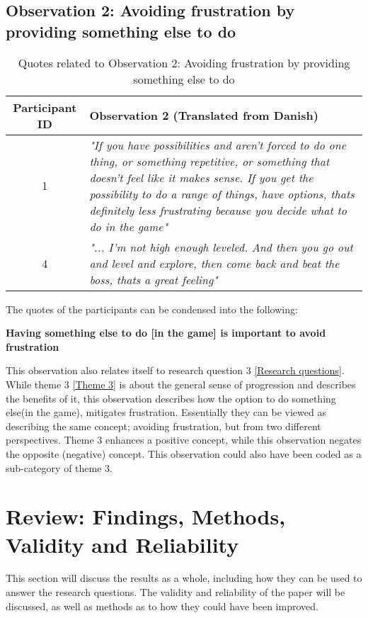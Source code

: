\subsection{Observation 2: Avoiding frustration by providing something else to do}\label{Observation 2}
\begin{table}[H]

\centering
\begin{tabular}{@{}c p{11cm}@{}}
\toprule
\textbf{Participant ID} & \textbf{Observation 2} (Translated from Danish)\\
\midrule

1 & \textit{"If you have possibilities and aren't forced to do one thing, or something repetitive, or something that doesn't feel like it makes sense. If you get the possibility to do a range of things, have options, thats definitely less frustrating because you decide what to do in the game"}\\

\midrule

4& \textit{"... I'm not high enough leveled. And then you go out and level and explore, then come back and beat the boss, thats a great feeling"}\\
\bottomrule
\end{tabular}

\caption{Quotes related to Observation 2: Avoiding frustration by providing something else to do}
\label{tab:obs2-quotes}
\end{table}

The quotes of the participants can be condensed into the following:
\begin{center}
    \textbf{Having something else to do [in the game] is important to avoid frustration}
\end{center}

This observation also relates itself to research question 3 \ref{Research questions}. While theme 3 \ref{Theme 3} is about the general sense of progression and describes the benefits of it, this observation describes how the option to do something else(in the game), mitigates frustration. Essentially they can be viewed as describing the same concept; avoiding frustration, but from two different perspectives. Theme 3 enhances a positive concept, while this observation negates the opposite (negative) concept. This observation could also have been coded as a sub-category of theme 3. 

\section{Review: Findings, Methods, Validity and Reliability}
This section will discuss the results as a whole, including how they can be used to answer the research questions. The validity and reliability of the paper will be discussed, as well as methods as to how they could have been improved. 


